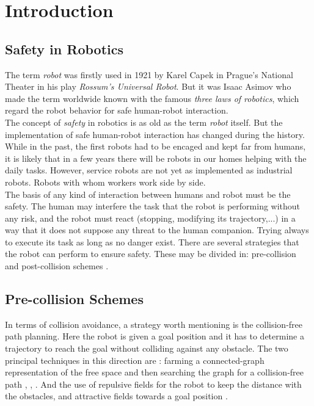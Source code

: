 \chapter{Introduction}
\label{ch:Introduction}





\section{Safety in Robotics}

The term \textit{robot} was firstly used in 1921 by Karel Capek in Prague's National Theater in his play \textit{Rossum's Universal Robot}. But it was Isaac Asimov who made the term worldwide known with the famous \textit{three laws of robotics}, which regard the robot behavior for safe human-robot interaction. \\
The concept of \textit{safety} in robotics is as old as the term \textit{robot} itself. But the implementation of safe human-robot interaction  has changed during the history. While in the past, the first robots had to be encaged and kept far from humans, it is likely that in a few years there will be robots in our homes helping with the daily tasks. However, service robots are not yet as implemented as industrial robots. Robots with whom workers work side by side. \\
The basis of any kind of interaction between humans and robot must be the safety. The human may interfere the task that the robot is performing without any risk, and the robot must react (stopping, modifying its trajectory,...) in a way that it does not suppose any threat to the human companion. Trying always to execute its task as long as no danger exist. 
There are several strategies that the robot can perform to ensure safety. These may be divided in: pre-collision and post-collision schemes .

\section{Pre-collision Schemes}
\label{sec:pre_collision}


In terms of collision avoidance, a strategy worth mentioning is the collision-free path planning. Here the robot is given a goal position and it has to determine a trajectory to reach the goal without colliding against any obstacle. The two principal techniques  in this direction are \cite{Craig:1989:IRM:534661}: farming a connected-graph representation of the free space and then searching the graph for a collision-free path \cite{Bobrow}, \cite{Shin}, \cite{Lozano}. And the use of repulsive fields for the robot to keep the distance with the obstacles, and  attractive fields towards a goal position \cite{Khatib1}.

